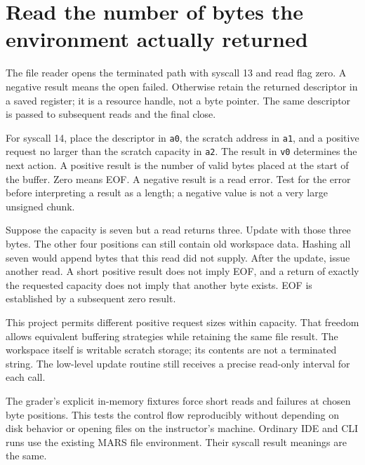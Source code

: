 \section{Read the number of bytes the environment actually returned}
The file reader opens the terminated path with syscall 13 and read flag zero. A
negative result means the open failed. Otherwise retain the returned descriptor in a
saved register; it is a resource handle, not a byte pointer. The same descriptor is
passed to subsequent reads and the final close.

For syscall 14, place the descriptor in \texttt{a0}, the scratch address in
\texttt{a1}, and a positive request no larger than the scratch capacity in
\texttt{a2}. The result in \texttt{v0} determines the next action. A positive
result is the number of valid bytes placed at the start of the buffer. Zero means EOF.
A negative result is a read error. Test for the error before interpreting a result as
a length; a negative value is not a very large unsigned chunk.

Suppose the capacity is seven but a read returns three. Update with those three bytes.
The other four positions can still contain old workspace data. Hashing all seven
would append bytes that this read did not supply. After the update, issue another
read. A short positive result does not imply EOF, and a return of exactly the requested
capacity does not imply that another byte exists. EOF is established by a subsequent
zero result.

This project permits different positive request sizes within capacity. That freedom
allows equivalent buffering strategies while retaining the same file result. The
workspace itself is writable scratch storage; its contents are not a terminated string.
The low-level update routine still receives a precise read-only interval for each call.

The grader's explicit in-memory fixtures force short reads and failures at chosen
byte positions. This tests the control flow reproducibly without depending on disk
behavior or opening files on the instructor's machine. Ordinary IDE and CLI runs use
the existing MARS file environment. Their syscall result meanings are the same.
